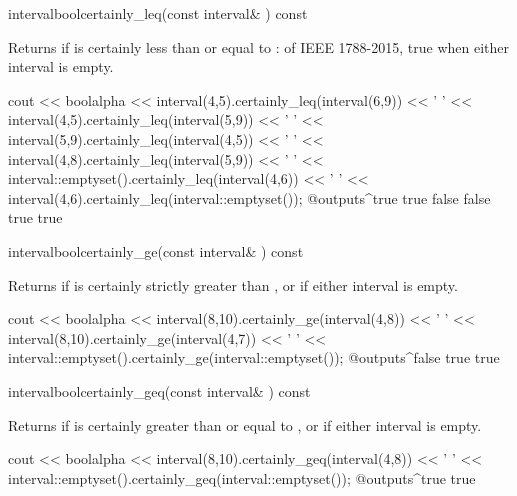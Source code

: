 \begin{defmethod}{interval}{bool}{certainly\_leq}{(const interval\& ) const}
  \begin{operation}
  \end{operation}
  Returns  if  is certainly less than or equal to
  :  of IEEE 1788-2015, true when either interval is
  empty.\newinvfive
  \begin{example}
cout << boolalpha << interval(4,5).certainly_leq(interval(6,9)) << ' '
     << interval(4,5).certainly_leq(interval(5,9)) << ' '
     << interval(5,9).certainly_leq(interval(4,5)) << ' '
     << interval(4,8).certainly_leq(interval(5,9)) << ' '
     << interval::emptyset().certainly_leq(interval(4,6)) << ' '
     << interval(4,6).certainly_leq(interval::emptyset());
@outputs^true true false false true true~
\end{example}
\end{defmethod}

\begin{defmethod}{interval}{bool}{certainly\_ge}{(const interval\& ) const}
  \begin{operation}
  \end{operation}
  Returns  if  is certainly strictly greater than
  , or if either interval is empty.\newinvfive
  \begin{example}
cout << boolalpha << interval(8,10).certainly_ge(interval(4,8)) << ' '
     << interval(8,10).certainly_ge(interval(4,7)) << ' '
     << interval::emptyset().certainly_ge(interval::emptyset());
@outputs^false true true~
  \end{example}
\end{defmethod}

\begin{defmethod}{interval}{bool}{certainly\_geq}{(const interval\& ) const}
  \begin{operation}
  \end{operation}
  Returns  if  is certainly greater than or equal to
  , or if either interval is empty.\newinvfive
  \begin{example}
cout << boolalpha << interval(8,10).certainly_geq(interval(4,8)) << ' '
     << interval::emptyset().certainly_geq(interval::emptyset());
@outputs^true true~
  \end{example}
\end{defmethod}

